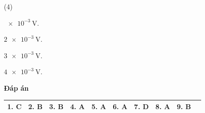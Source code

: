 \begin{enumerate}
{			
	}
	\textbf{Đáp án}
	\begin{center}
		\begin{tabular}{|m{2.8em}|m{2.8em}|m{2.8em}|m{2.8em}|m{2.8em}|m{2.8em}|m{2.8em}|m{2.8em}|m{2.8em}|m{2.8em}|}
			\hline
			1. C & 2. B & 3. B & 4. A & 5. A & 6. A & 7. D & 8. A & 9. B &\\
			\hline
		\end{tabular}
	\end{center}
\end{enumerate}